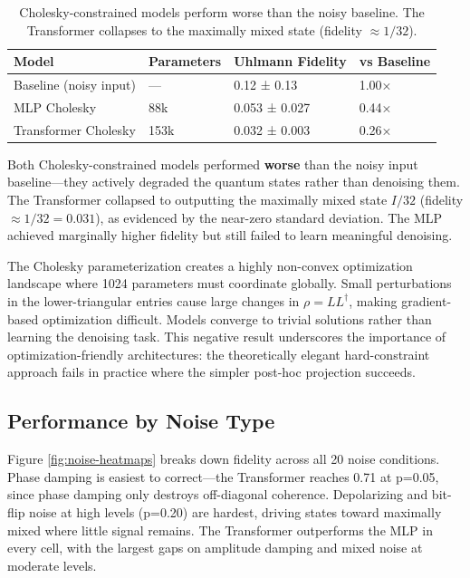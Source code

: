 \documentclass[11pt]{article}
\begin{document}
\begin{table}[htbp]
\caption{\label{tab:orga4982b1}Cholesky-constrained models perform worse than the noisy baseline. The Transformer collapses to the maximally mixed state (fidelity \(\approx 1/32\)).}
\centering
\begin{tabular}{llll}
Model & Parameters & Uhlmann Fidelity & vs Baseline\\
\hline
Baseline (noisy input) & — & 0.12 ± 0.13 & 1.00×\\
MLP Cholesky & 88k & 0.053 ± 0.027 & 0.44×\\
Transformer Cholesky & 153k & 0.032 ± 0.003 & 0.26×\\
\end{tabular}
\end{table}

Both Cholesky-constrained models performed \textbf{worse} than the noisy input baseline—they actively degraded the quantum states rather than denoising them. The Transformer collapsed to outputting the maximally mixed state \(I/32\) (fidelity \(\approx 1/32 = 0.031\)), as evidenced by the near-zero standard deviation. The MLP achieved marginally higher fidelity but still failed to learn meaningful denoising.

The Cholesky parameterization creates a highly non-convex optimization landscape where 1024 parameters must coordinate globally. Small perturbations in the lower-triangular entries cause large changes in \(\rho = LL^\dagger\), making gradient-based optimization difficult. Models converge to trivial solutions rather than learning the denoising task. This negative result underscores the importance of optimization-friendly architectures: the theoretically elegant hard-constraint approach fails in practice where the simpler post-hoc projection succeeds.

\newpage
\subsection{Performance by Noise Type}
\label{sec:org72e3f28}

Figure \ref{fig:noise-heatmaps} breaks down fidelity across all 20 noise conditions. Phase damping is easiest to correct—the Transformer reaches 0.71 at p=0.05, since phase damping only destroys off-diagonal coherence. Depolarizing and bit-flip noise at high levels (p=0.20) are hardest, driving states toward maximally mixed where little signal remains. The Transformer outperforms the MLP in every cell, with the largest gaps on amplitude damping and mixed noise at moderate levels.
\end{document}
